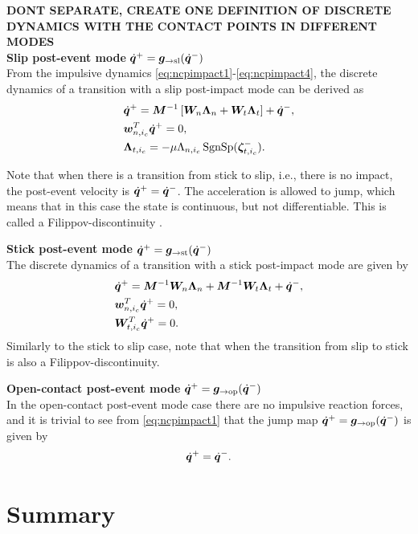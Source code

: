 \documentclass[../DC2017114Bouma.tex]{subfiles}
\begin{document}
\textbf{DONT SEPARATE, CREATE ONE DEFINITION OF DISCRETE DYNAMICS WITH THE CONTACT POINTS IN DIFFERENT MODES}\\
\textbf{Slip post-event mode} $\dot{{\boldsymbol{q}}}^+ = {\boldsymbol{g}}_{\rightarrow\text{sl}}(\dot{{\boldsymbol{q}}}^-)$\\
From the impulsive dynamics \eqref{eq:ncpimpact1}-\eqref{eq:ncpimpact4}, the discrete dynamics of a transition with a slip post-impact mode can be derived as
\begin{align}
&\dot{{\boldsymbol{q}}}^+ = {\boldsymbol{M}}^{-1}\left[{\boldsymbol{W}}_{n}\boldsymbol{\Lambda}_{n} + {\boldsymbol{W}}_{t}\boldsymbol{\Lambda}_{t}\right] + \dot{{\boldsymbol{q}}}^-,\label{eq:discslip1}\\
&{\boldsymbol{w}}^T_{n,i_c}\dot{{\boldsymbol{q}}}^+ = 0,\label{eq:discslip2}\\
&\boldsymbol{\Lambda}_{t,i_c} = -\mu\Lambda_{n,i_c}\operatorname{\text{SgnSp}}(\boldsymbol{\zeta}^-_{t,i_c}).\label{eq:discslip3}
\end{align}


Note that when there is a transition from stick to slip, i.e., there is no impact, the post-event velocity is $\dot{{\boldsymbol{q}}}^+ = \dot{{\boldsymbol{q}}}^-$. The acceleration is allowed to jump, which means that in this case the state is continuous, but not differentiable. This is called a Filippov-discontinuity \cite{Filippov1988}.

\textbf{Stick post-event mode} $\dot{{\boldsymbol{q}}}^+ = {\boldsymbol{g}}_{\rightarrow\text{st}}(\dot{{\boldsymbol{q}}}^-)$\\
The discrete dynamics of a transition with a stick post-impact mode are given by
\begin{align}
&\dot{{\boldsymbol{q}}}^+ = {\boldsymbol{M}}^{-1}{\boldsymbol{W}}_{n}\boldsymbol{\Lambda}_{n} + {\boldsymbol{M}}^{-1}{\boldsymbol{W}}_{t}\boldsymbol{\Lambda}_{t} + \dot{{\boldsymbol{q}}}^-,\label{eq:discstick1}\\
&{\boldsymbol{w}}^T_{n,i_c}\dot{{\boldsymbol{q}}}^+ = 0,\label{eq:discstick2}\\
&{\boldsymbol{W}}^T_{t,i_c}\dot{{\boldsymbol{q}}}^+ = 0.\label{eq:discstick3}
\end{align}
Similarly to the stick to slip case, note that when the transition from slip to stick is also a Filippov-discontinuity.

\textbf{Open-contact post-event mode} $\dot{{\boldsymbol{q}}}^+ = {\boldsymbol{g}}_{\rightarrow\text{op}}(\dot{{\boldsymbol{q}}}^-)$\\
In the open-contact post-event mode case there are no impulsive reaction forces, and it is trivial to see from \eqref{eq:ncpimpact1} that the jump map $\dot{{\boldsymbol{q}}}^+ = {\boldsymbol{g}}_{\rightarrow\text{op}}(\dot{{\boldsymbol{q}}}^-)$ is given by
\begin{align}
\dot{{\boldsymbol{q}}}^+ = \dot{{\boldsymbol{q}}}^-.\label{eq:gopen}
\end{align}

\section{Summary}
\end{document}
